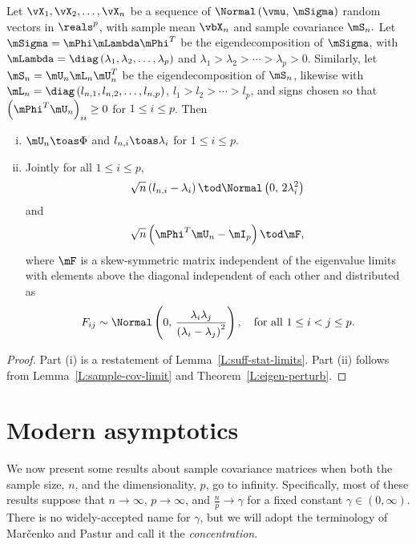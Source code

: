 \begin{theorem}
Let $\vX_1, \vX_2, \ldots, \vX_n$ be a sequence of \iid 
\(
    \Normal \left(
        \vmu, \,
        \mSigma
    \right)
\)
random vectors in $\reals^p$, with sample mean
\(
    \vbX_n
\)
and sample covariance
\(
    \mS_n.
\)
Let $\mSigma = \mPhi \mLambda \mPhi^T$ be the eigendecomposition
of $\mSigma$, with
\(
    \mLambda = \diag \left(
        \lambda_1,
        \lambda_2,
        \ldots,
        \lambda_p
    \right)
\)
and
\(
    \lambda_1 > \lambda_2 > \cdots > \lambda_p > 0
\).
Similarly, let $\mS_n = \mU_n \mL_n \mU_n^T$ be the eigendecomposition of $\mS_n$, likewise with
\(
    \mL_n = \diag \left(
        l_{n,1},
        l_{n,2},
        \ldots,
        l_{n,p}
    \right)
\),
\(
    l_1 > l_2 > \cdots > l_p
\),
and signs chosen so that
\(
    \left( \mPhi^T \mU_n \right)_{ii} \geq 0
\)
for $1 \leq i \leq p$.  Then
\begin{enumerate}[(i)]
    \item $\mU_n \toas \Phi$ and $l_{n,i} \toas \lambda_i$ for
        $1 \leq i \leq p$.
    \item Jointly for all $1 \leq i \leq p$,
        \[
            \sqrt{n} \left( l_{n,i} - \lambda_i \right) 
            \tod 
            \Normal\left( 0, \, 2 \lambda_i^2 \right)
        \]
        and
        \[
            \sqrt{n} \left( \mPhi^T \mU_n - \mI_p \right) \tod \mF,
        \]
        where $\mF$ is a skew-symmetric matrix independent of the
        eigenvalue limits with elements above the diagonal independent of
        each other and distributed as 
        \[
            F_{ij}
            \sim
            \Normal \left(
                0, \,
                \frac{\lambda_i \lambda_j}
                     {\left( \lambda_i - \lambda_j \right)^2}
            \right),
            \quad
            \text{for all $1 \leq i < j \leq p$.}
        \]
\end{enumerate}
\end{theorem}
\begin{proof}
Part (i) is a restatement of Lemma~\ref{L:suff-stat-limits}.  Part (ii) follows from Lemma~\ref{L:sample-cov-limit} and Theorem~\ref{L:eigen-perturb}.
\end{proof}


\section{Modern asymptotics}

We now present some results about sample covariance matrices when both the sample size, $n$, and the dimensionality, $p$, go to infinity.  Specifically, most of these results suppose that $n \to \infty$, $p \to \infty$, and 
\(
    \frac{n}{p} \to \gamma
\)
for a fixed constant
\(
    \gamma \in \left( 0, \infty \right).
\)
There is no widely-accepted name for $\gamma$, but we will adopt the terminology of Mar\v{c}enko and Pastur \cite{marcenko1967des} and call it the \emph{concentration}.


